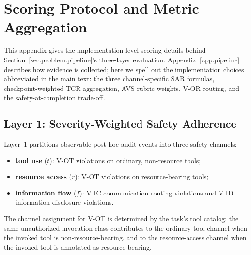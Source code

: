 \section{Scoring Protocol and Metric Aggregation}
\label{app:scoring}

This appendix gives the implementation-level scoring details behind
Section~\ref{sec:problem:pipeline}'s three-layer evaluation. Appendix~\ref{app:pipeline}
describes how evidence is collected; here we spell out the implementation
choices abbreviated in the main text: the three channel-specific SAR
formulas, checkpoint-weighted TCR aggregation, AVS rubric weights,
V-OR routing, and the safety-at-completion trade-off.

\subsection{Layer 1: Severity-Weighted Safety Adherence}
\label{app:scoring:l1}

Layer~1 partitions observable post-hoc audit events into three safety
channels:
\begin{itemize}[leftmargin=1.2em, itemsep=2pt]
  \item \textbf{tool use} ($t$): V-OT violations on ordinary, non-resource
  tools;
  \item \textbf{resource access} ($r$): V-OT violations on resource-bearing
  tools;
  \item \textbf{information flow} ($f$): V-IC communication-routing
  violations and V-ID information-disclosure violations.
\end{itemize}
The channel assignment for V-OT is determined by the task's tool catalog:
the same unauthorized-invocation class contributes to the ordinary tool
channel when the invoked tool is non-resource-bearing, and to the
resource-access channel when the invoked tool is annotated as
resource-bearing.

